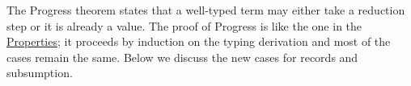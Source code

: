 The Progress theorem states that a well-typed term may either take a
reduction step or it is already a value. The proof of Progress is like
the one in the \protect\hyperlink{Properties}{Properties}; it proceeds
by induction on the typing derivation and most of the cases remain the
same. Below we discuss the new cases for records and subsumption.

\begin{fence}
\begin{code}%
\>[0]\AgdaSpace{}%
\AgdaSpace{}%
\AgdaSymbol{(}\AgdaSpace{}%
\AgdaSymbol{:}\AgdaSpace{}%
\AgdaSymbol{)}\AgdaSpace{}%
\AgdaSymbol{:}\AgdaSpace{}%
\AgdaSpace{}%
\<%
\\
%
\\[\AgdaEmptyExtraSkip]%
\>[0][@{}l@{\AgdaIndent{0}}]%
\>[2]\AgdaSpace{}%
\AgdaSymbol{:}\AgdaSpace{}%
\AgdaSpace{}%
\AgdaSymbol{\{}\AgdaSymbol{\}}\<%
\\
\>[2][@{}l@{\AgdaIndent{0}}]%
\>[4]%
\>[2298I]\AgdaSpace{}%
\AgdaSpace{}%
\<%
\\
\>[.][@{}l@{}]\<[2298I]%
\>[6]\AgdaComment{----------}\<%
\\
%
\>[4]\AgdaSpace{}%
\AgdaSpace{}%
\<%
\\
%
\\[\AgdaEmptyExtraSkip]%
%
\>[2]\AgdaSpace{}%
\AgdaSymbol{:}\<%
\\
\>[2][@{}l@{\AgdaIndent{0}}]%
\>[6]\AgdaSpace{}%
\<%
\\
%
\>[6]\AgdaComment{----------}\<%
\\
\>[2][@{}l@{\AgdaIndent{0}}]%
\>[4]\AgdaSpace{}%
\AgdaSpace{}%
\<%
\end{code}
\end{fence}

